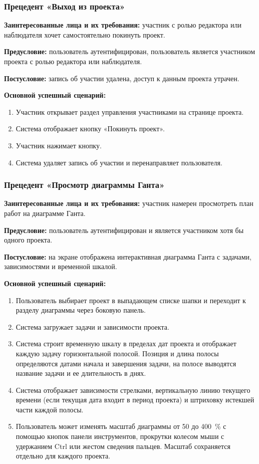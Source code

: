 \subsubsection{Прецедент «Выход из проекта»}

\textbf{Заинтересованные лица и их требования:} участник с ролью редактора или наблюдателя хочет самостоятельно покинуть проект.

\textbf{Предусловие:} пользователь аутентифицирован, пользователь является участником проекта с ролью редактора или наблюдателя.

\textbf{Постусловие:} запись об участии удалена, доступ к данным проекта утрачен.

\textbf{Основной успешный сценарий:}
\begin{enumerate}
    \item Участник открывает раздел управления участниками на странице проекта.
    \item Система отображает кнопку «Покинуть проект».
    \item Участник нажимает кнопку.
    \item Система удаляет запись об участии и перенаправляет пользователя.
\end{enumerate}

\subsubsection{Прецедент «Просмотр диаграммы Ганта»}

\textbf{Заинтересованные лица и их требования:} участник намерен просмотреть план работ на диаграмме Ганта.

\textbf{Предусловие:} пользователь аутентифицирован и является участником хотя бы одного проекта.

\textbf{Постусловие:} на экране отображена интерактивная диаграмма Ганта с задачами, зависимостями и временной шкалой.

\textbf{Основной успешный сценарий:}
\begin{enumerate}
    \item Пользователь выбирает проект в выпадающем списке шапки и переходит к разделу диаграммы через боковую панель.
    \item Система загружает задачи и зависимости проекта.
    \item Система строит временную шкалу в пределах дат проекта и отображает каждую задачу горизонтальной полосой. Позиция и длина полосы определяются датами начала и завершения задачи, на полосе выводятся название задачи и ее длительность в днях.
    \item Система отображает зависимости стрелками, вертикальную линию текущего времени (если текущая дата входит в период проекта) и штриховку истекшей части каждой полосы.
    \item Пользователь может изменять масштаб диаграммы от 50 до 400~\% с помощью кнопок панели инструментов, прокрутки колесом мыши с удержанием Ctrl или жестом сведения пальцев. Масштаб сохраняется отдельно для каждого проекта.
\end{enumerate}

